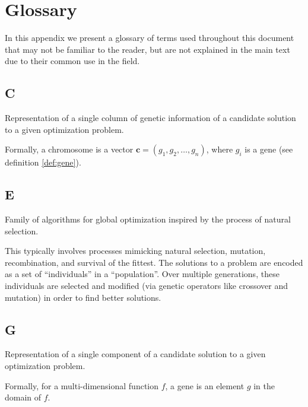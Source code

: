 \chapter{Glossary}
\label{appendix:glossary}
  In this appendix we present a glossary of terms used throughout this document that may not be
  familiar to the reader, but are not explained in the main text due to their common use in the
  field.

  \section*{C}
    \begin{definition}[Chromosome]
    \label{def:chromosome}
      Representation of a single column of genetic information of a candidate solution to a given
      optimization problem.

      Formally, a chromosome is a vector \(\textbf{c} = (g_1, g_2, \dots, g_n)\), where \(g_i\) is a
      gene (see definition \ref{def:gene}).
    \end{definition}

  \section*{E}
    \begin{definition}
    \label{def:evolutionary_computation}
      Family of algorithms for global optimization inspired by the process of natural selection.

      This typically involves processes mimicking natural selection, mutation, recombination, and 
      survival of the fittest. 
      The solutions to a problem are encoded as a set of \enquote{individuals} in a 
      \enquote{population}. 
      Over multiple generations, these individuals are selected and modified (via genetic operators 
      like crossover and mutation) in order to find better solutions.
    \end{definition}

  \section*{G}
    \begin{definition}[Gene]
    \label{def:gene}
      Representation of a single component of a candidate solution to a given optimization problem.

      Formally, for a multi-dimensional function \(f\), a gene is an element \(g\) in the domain of
      \(f\).
    \end{definition}


